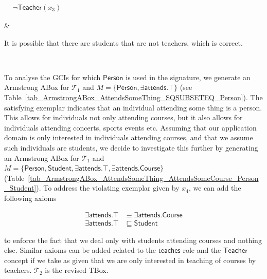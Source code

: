 \documentclass{amsart}
\newcommand\tableExamplarSpacing{3.5cm}
\newcommand\tableCommentSpacing{4cm}
\begin{document}
\begin{table}
\begin{center}
\begin{tabular}
\begin{minipage}{\tableExamplarSpacing}
  	    \vspace{2pt}
  	   $\begin{aligned}
             &\neg\mathsf{Teacher}(x_3)
  	    \end{aligned}$ 
  	\end{minipage}
        &
        \begin{minipage}{\tableCommentSpacing}
            \vspace{2pt}
            It is possible that there are students that are not teachers, which is correct.
            \vspace{2pt}
        \end{minipage}     
        \\        
         \hline      
       \end{tabular}
     \end{center}
     \normalsize
   \end{table}
   
   To analyse the GCIs for which $\mathsf{Person}$ is used in the signature, we generate an Armstrong ABox for $\mathcal{T}_1$ and $M = \{\mathsf{Person}, \exists \mathsf{attends}. \top\}$ (see Table~\ref{tab_ArmstrongABox_AttendsSomeThing_SQSUBSETEQ_Person}). The satisfying exemplar indicates that an individual attending some thing is a person. This allows for individuals not only attending courses, but it also allows for individuals attending concerts, sports events etc.     
   Assuming that our application domain is only interested in individuals attending courses, and that we assume such individuals are students, we decide to investigate this further by generating an Armstrong ABox for $\mathcal{T}_1$ and $M = \{\mathsf{Person}, \mathsf{Student}, \exists\mathsf{attends}.\top, \exists\mathsf{attends}.\mathsf{Course}\}$ (Table~\ref{tab_ArmstrongABox_AttendsSomeThing_AttendsSomeCourse_Person_Student}). To address the violating exemplar given by $x_4$, we can add the following axioms 
   
  	   \begin{align*}
             \exists \mathsf{attends}.\top &\equiv \exists \mathsf{attends}.\mathsf{Course}\\
             \exists \mathsf{attends}.\top &\sqsubseteq \mathsf{Student}
  	    \end{align*}
   
   to enforce the fact that we deal only with students attending courses and nothing else. Similar axioms can be added related to the $\mathsf{teaches}$ role and the $\mathsf{Teacher}$ concept if we take as given that we are only interested in teaching of courses by teachers.  $\mathcal{T}_2$ is the revised TBox.    
   
\end{document}
